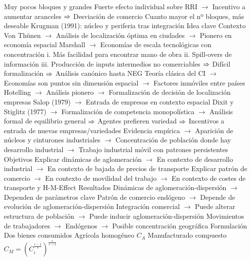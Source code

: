 \documentclass{nuevotema}
\begin{document}
\begin{esquemal}
				\4 Muy pocos bloques y grandes
				\4[] Fuerte efecto individual sobre RRI
				\4[] $\to$ Incentivo a aumentar aranceles
				\4[] $\then$ Desviación de comercio
				\4[$\then$] Cuanto mayor el nº bloques, más deseable
	\1 
		\2 Krugman (1991): núcleo y periferia tras integración
			\3 Idea clave
				\4 Contexto
				\4[] Von Thünen
				\4[] $\to$ Análisis de localización óptima en ciudades
				\4[] $\to$ Pionero en economía espacial
				\4[] Marshall
				\4[] $\to$ Economías de escala tecnológicas con concentración
				\4[] i. Más facilidad para encontrar mano de obra
				\4[] ii. Spill-overs de información
				\4[] iii. Producción de inputs intermedios no comerciables
				\4[] $\then$ Difícil formalización
				\4[] $\then$ Análisis canónico hasta NEG
				\4[] Teoría clásica del CI
				\4[] $\to$ Economías son puntos sin dimensión espacial
				\4[] $\to$ Factores inmóviles entre países
				\4[] Hotelling
				\4[] $\to$ Análisis pionero
				\4[] $\to$ Formalización de decisión de localización empresas
				\4[] Salop (1979)
				\4[] $\to$ Entrada de empresas en contexto espacial
				\4[] Dixit y Stiglitz (1977)
				\4[] $\to$ Formalización de competencia monopolística
				\4[] $\to$ Análisis formal de equilibrio general
				\4[] $\then$ Agentes prefieren variedad
				\4[] $\then$ Incentivos a entrada de nuevas empresas/variedades
				\4[] Evidencia empírica
				\4[] $\to$ Aparición de núcleos y cinturones industriales
				\4[] $\to$ Concentración de población donde hay desarrollo industrial
				\4[] $\to$ Trabajo industrial móvil con patrones persistentes
				\4 Objetivos
				\4[] Explicar dinámicas de aglomeración
				\4[] $\to$ En contexto de desarrollo industrial
				\4[] $\to$ En contexto de bajada de precios de transporte
				\4[] Explicar patrón de comercio
				\4[] $\to$ En contexto de movilidad del trabajo
				\4[] $\to$ En contexto de costes de transporte y H-M-Effect
				\4 Resultados
				\4[] Dinámicas de aglomeración-dispersión
				\4[] $\to$ Dependen de parámetros clave
				\4[] Patrón de comercio endógeno
				\4[] $\to$ Depende de evolución de aglomeración-dispersión
				\4[] Integración comercial
				\4[] $\to$ Puede alterar estructura de población
				\4[] $\to$ Puede inducir aglomeración-dispersión
				\4[] Movimientos de trabajadores
				\4[] $\to$ Endógenos
				\4[] $\to$ Posible concentración geográfica
			\3 Formulación
				\4 Dos bienes consumidos
				\4[] Agrícola homogéneo $C_A$
				\4[] Manufacturado compuesto $C_M = \left( C_i^{\frac{\epsilon-1}{\epsilon}} \right)^{\frac{\epsilon}{\epsilon-1}}$

\end{esquemal}
\end{document}
